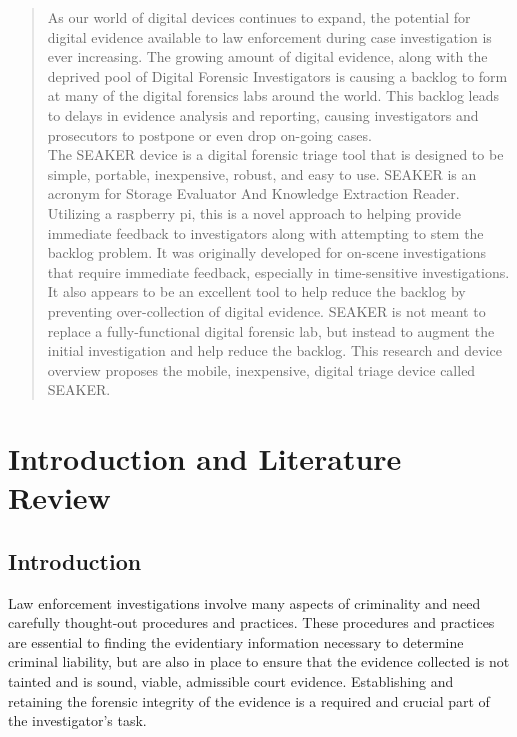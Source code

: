 \documentclass[12pt]{article}
\begin{document}
\begin{abstract}
As our world of digital devices continues to expand, the potential for digital evidence available to law
enforcement during case investigation is ever increasing.  The growing amount of digital evidence, along with
the deprived pool of Digital Forensic Investigators is causing a backlog to form at many of the digital
forensics labs around the world.  This backlog leads to delays in evidence analysis and reporting, causing
investigators and prosecutors to postpone or even drop on-going cases.\\

The SEAKER device is a digital forensic triage tool that is designed to be simple, portable, inexpensive,
robust, and easy to use.  SEAKER is an acronym for Storage Evaluator And Knowledge Extraction Reader.  
Utilizing a raspberry pi, this is a novel approach to helping provide immediate feedback to investigators
along with attempting to stem the backlog problem.  It was originally developed for on-scene investigations
that require immediate feedback, especially in time-sensitive investigations.  It also appears to be an
excellent tool to help reduce the backlog by preventing over-collection of digital evidence.  SEAKER is not
meant to replace a fully-functional digital forensic lab, but instead to augment the initial investigation
and help reduce the backlog.  This research and device overview proposes the mobile, inexpensive, digital
triage device called SEAKER.
\end{abstract}

\newpage
{}

\tableofcontents

\newpage

\listoffigures

\newpage

\listoftables

\newpage
{}


\section{Introduction and Literature Review}
\label{sect-IntroAndLitReview}

\subsection{Introduction}
Law enforcement investigations involve many aspects of criminality and need carefully thought-out
procedures and practices.  These procedures and practices are essential to finding the evidentiary
information necessary to determine criminal liability, but are also in place to ensure that the evidence
collected is not tainted and is sound, viable, admissible court evidence.  Establishing and retaining the
forensic integrity of the evidence is a required and crucial part of the investigator's task.\\
\end{document}

